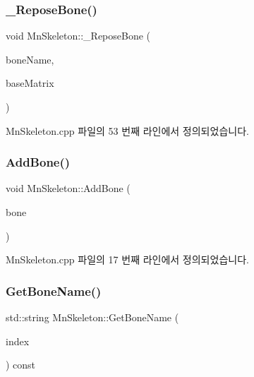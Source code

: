 \subsubsection{\texorpdfstring{\+\_\+\+Repose\+Bone()}{\_ReposeBone()}}
{\footnotesize\ttfamily void Mn\+Skeleton\+::\+\_\+\+Repose\+Bone (\begin{DoxyParamCaption}\item[{const std\+::string \&}]{bone\+Name,  }\item[{const Direct\+X\+::\+Simple\+Math\+::\+Matrix \&}]{base\+Matrix }\end{DoxyParamCaption})\hspace{0.3cm}{\ttfamily [private]}}



Mn\+Skeleton.\+cpp 파일의 53 번째 라인에서 정의되었습니다.

\mbox{\label{class_m_n_l_1_1_mn_skeleton_a21b331c44d2cc80bcc1401fa87cce13f}} 
\subsubsection{\texorpdfstring{Add\+Bone()}{AddBone()}}
{\footnotesize\ttfamily void Mn\+Skeleton\+::\+Add\+Bone (\begin{DoxyParamCaption}\item[{const \hyperlink{class_m_n_l_1_1_mn_bone}{Mn\+Bone} \&}]{bone }\end{DoxyParamCaption})}



Mn\+Skeleton.\+cpp 파일의 17 번째 라인에서 정의되었습니다.

\mbox{\label{class_m_n_l_1_1_mn_skeleton_a1536e0bb8da6bdb03b6ce117fa995869}} 
\subsubsection{\texorpdfstring{Get\+Bone\+Name()}{GetBoneName()}}
{\footnotesize\ttfamily std\+::string Mn\+Skeleton\+::\+Get\+Bone\+Name (\begin{DoxyParamCaption}\item[{U\+I\+NT}]{index }\end{DoxyParamCaption}) const}



